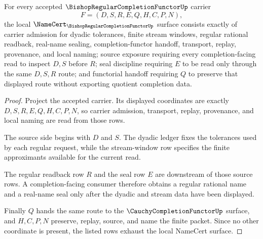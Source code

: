 \begin{theorem}
\label{thm:bishop-regular-completion-functor-namecert-obligations}
For every accepted $\BishopRegularCompletionFunctorUp$ carrier
$$
F=(D,S,R,E,Q,H,C,P,N),
$$
the local $\NameCert_{\BishopRegularCompletionFunctorUp}$ surface consists exactly of carrier admission for dyadic tolerances, finite stream windows, regular rational readback, real-name sealing, completion-functor handoff, transport, replay, provenance, and local naming; source exposure requiring every completion-facing read to inspect $D,S$ before $R$; seal discipline requiring $E$ to be read only through the same $D,S,R$ route; and functorial handoff requiring $Q$ to preserve that displayed route without exporting quotient completion data.
\end{theorem}
\begin{proof}
Project the accepted carrier. Its displayed coordinates are exactly $D,S,R,E,Q,H,C,P,N$, so carrier admission, transport, replay, provenance, and local naming are read from those rows.

The source side begins with $D$ and $S$. The dyadic ledger fixes the tolerances used by each regular request, while the stream-window row specifies the finite approximants available for the current read.

The regular readback row $R$ and the seal row $E$ are downstream of those source rows. A completion-facing consumer therefore obtains a regular rational name and a real-name seal only after the dyadic and stream data have been displayed.

Finally $Q$ hands the same route to the $\CauchyCompletionFunctorUp$ surface, and $H,C,P,N$ preserve, replay, source, and name the finite packet. Since no other coordinate is present, the listed rows exhaust the local NameCert surface.
\end{proof}

